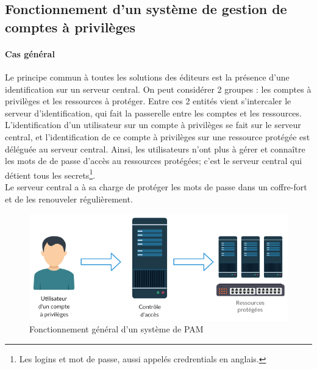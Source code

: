 \subsection{Fonctionnement d'un système de gestion de comptes à privilèges}

\paragraph{Cas général}
Le principe commun à toutes les solutions des éditeurs est la présence d'une identification sur un serveur central. On peut considérer 2 groupes : les comptes à privilèges et les ressources à protéger. Entre ces 2 entités vient s'intercaler le serveur d'identification, qui fait la passerelle entre les comptes et les ressources.\\
L'identification d'un utilisateur sur un compte à privilèges se fait sur le serveur central, et l'identification de ce compte à privilèges sur une ressource protégée est déléguée au serveur central. Ainsi, les utilisateurs n'ont plus à gérer et connaître les mots de de passe d'accès au ressources protégées; c'est le serveur central qui détient tous les secrets\footnote{Les logins et mot de passe, aussi appelés \og credrentials \fg{} en anglais.}.\\
Le serveur central a à sa charge de protéger les mots de passe dans un coffre-fort et de les renouveler régulièrement.

\begin{figure}[!ht]
    \center
    \includegraphics[width=\textwidth]{./images/Schema_ultra_light_PAM.png}
    \caption{Fonctionnement général d'un système de PAM}
\end{figure}

